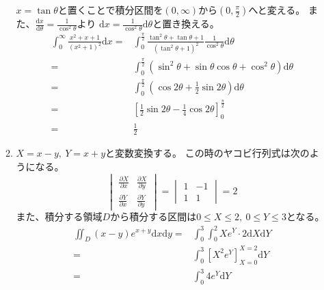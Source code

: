 \documentclass[12pt,b5paper]{ltjsarticle}
\begin{document}
\begin{enumerate}
\begin{enumerate}

            $x=\tan\theta$と置くことで積分区間を$(0,\infty)$から$(0,\frac{\pi}{2})$へと変える。
            また、$\frac{\mathrm{d}x}{\mathrm{d}\theta}=\frac{1}{\cos^2\theta}$より
            $\mathrm{d}x=\frac{1}{\cos^2\theta}\mathrm{d}\theta$と置き換える。
            \begin{align}
             \int_{0}^{\infty}\frac{x^2+x+1}{(x^2+1)^2}\mathrm{d}x
             =& \int_{0}^{\frac{\pi}{2}}
             \frac{\tan^2\theta+\tan\theta+1}{(\tan^2\theta+1)^2}
             \frac{1}{\cos^2\theta}\mathrm{d}\theta \label{tr_tan}\\
             =& \int_{0}^{\frac{\pi}{2}}
             (\sin^2\theta +\sin\theta\cos\theta+\cos^2\theta)
             \mathrm{d}\theta\\
             =& \int_{0}^{\frac{\pi}{2}}
             \left(\cos2\theta+\frac{1}{2}\sin2\theta\right)
             \mathrm{d}\theta\\
             =& \left[
             \frac{1}{2}\sin 2\theta - \frac{1}{4}\cos 2\theta
             \right]_{0}^{\frac{\pi}{2}}\\
             =& \frac{1}{2}
            \end{align}
       \item
            $X=x-y,\ Y=x+y$と変数変換する。
            この時のヤコビ行列式は次のようになる。
            \begin{equation}
             \begin{vmatrix}
              \frac{\partial X}{\partial x} & \frac{\partial X}{\partial y}\\
              \frac{\partial Y}{\partial x} & \frac{\partial Y}{\partial y}
             \end{vmatrix}
             =\begin{vmatrix}1&-1\\1&1\end{vmatrix}
             =2
            \end{equation}
            また、積分する領域$D$から積分する区間は$0\leq X\leq 2,\ 0\leq Y\leq 3$となる。
            \begin{align}
             \iint_{D}(x-y)e^{x+y}\mathrm{d}x\mathrm{d}y
             =& \int_{0}^{3} \!\!\! \int_{0}^{2}Xe^{Y} \cdot2\mathrm{d}X\mathrm{d}Y\\
             =& \int_{0}^{3} \left[ X^2e^{Y} \right]_{X=0}^{X=2}\mathrm{d}Y\\
             =& \int_{0}^{3} 4e^{Y} \mathrm{d}Y\\

\end{align}
\end{enumerate}
\end{enumerate}
\end{document}

